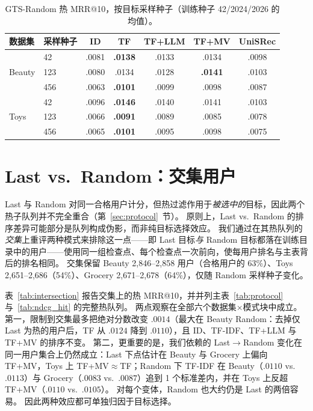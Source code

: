 \documentclass[sigconf,natbib=true,anonymous]{acmart}
\newcommand{\tfidf}{\textsc{TF-IDF}\xspace}
\newcommand{\tfllm}{\textsc{TF+LLM}\xspace}
\newcommand{\tfmv}{\textsc{TF+MV}\xspace}
\begin{document}
\begin{table}[h]
\centering
\caption{GTS-Random 热 MRR@10，按目标采样种子（训练种子 42/2024/2026 的均值）。}
\label{tab:random-seeds}
\small
\setlength{\tabcolsep}{3pt}
\begin{tabular}{@{}llccccc@{}}
\toprule
数据集 & 采样种子 & ID & TF & TF+LLM & TF+MV & UniSRec \\
\midrule
\multirow{3}{*}{Beauty}
 & 42    & .0081 & \textbf{.0138} & .0133 & .0134 & .0098 \\
 & 123   & .0080 & .0134 & .0128 & \textbf{.0141} & .0103 \\
 & 456   & .0063 & \textbf{.0101} & .0099 & .0098 & .0087 \\
\midrule
\multirow{3}{*}{Toys}
 & 42    & .0096 & \textbf{.0146} & .0140 & .0141 & .0103 \\
 & 123   & .0066 & \textbf{.0091} & .0089 & .0085 & .0078 \\
 & 456   & .0065 & \textbf{.0101} & .0095 & .0098 & .0075 \\
\bottomrule
\end{tabular}
\end{table}

\section{Last vs.\ Random：交集用户}
\label{app:intersection}

Last 与 Random 对同一合格用户计分，但热过滤作用于\emph{被选中的}目标，因此两个热子队列并不完全重合（第~\ref{sec:protocol}~节）。
原则上，Last vs.\ Random 的排序差异可能部分是队列构成伪影，而非纯目标选择效应。
我们通过在其热队列的\emph{交集}上重评两种模式来排除这一点——即 Last 目标\emph{与} Random 目标都落在训练目录中的用户——使用同一组检查点、每个检查点一次前向，使每用户排名与主表背后的排名相同。
交集保留 Beauty 2{,}846--2{,}858 用户（合格用户的 63\%）、Toys 2{,}651--2{,}686（54\%）、Grocery 2{,}671--2{,}678（64\%），仅随 Random 采样种子变化。

表~\ref{tab:intersection} 报告交集上的热 MRR@10，并并列主表~\ref{tab:protocol} 与~\ref{tab:ndcg_hit} 的完整热队列。
两点观察在全部六个数据集$\times$模式块中成立。
第一，限制到交集最多把绝对分数改变 $.0014$（最大在 Beauty Random：去掉仅 Last 为热的用户后，TF 从 $.0124$ 降到 $.0110$），且 ID、\tfidf、\tfllm 与 \tfmv 的排序不变。
第二，更重要的是，我们依赖的 Last$\to$Random 变化在同一用户集合上仍然成立：Last 下点估计在 Beauty 与 Grocery 上偏向 \tfmv，Toys 上 TF+MV${}\approx{}$TF；Random 下 \tfidf 在 Beauty（$.0110$ vs.\ $.0113$）与 Grocery（$.0083$ vs.\ $.0087$）追到 1 个标准差内，并在 Toys 上反超 \tfmv（$.0110$ vs.\ $.0105$）。
对每个变体，Random 也大约仍是 Last 的两倍容易。
因此两种效应都可单独归因于目标选择。
\end{document}
